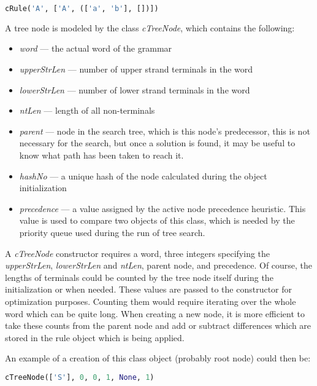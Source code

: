 \begin{lstlisting}[language=Python]
  cRule('A', ['A', (['a', 'b'], [])])
\end{lstlisting}

\bigskip

A tree node is modeled by the class \textit{cTreeNode}, which contains the following:
\begin{itemize}
  \item{\textit{word} --- the actual word of the grammar}
  \item{\textit{upperStrLen} --- number of upper strand terminals in the word}
  \item{\textit{lowerStrLen} --- number of lower strand terminals in the word}
  \item{\textit{ntLen} --- length of all non-terminals}
  \item{\textit{parent} --- node in the search tree, which is this node's  predecessor, this is not necessary for the search, but once a solution is found, it may be useful to know what path has been taken to reach it.}
  \item{\textit{hashNo} --- a unique hash of the node calculated during the object initialization}
  \item{\textit{precedence} --- a value assigned by the active node precedence heuristic. This value is used to compare two objects of this class, which is needed by the priority queue used during the run of tree search.}
\end{itemize}

A \textit{cTreeNode} constructor requires a word, three integers specifying the \textit{upperStrLen}, \textit{lowerStrLen} and \textit{ntLen}, parent node, and precedence. Of course, the lengths of terminals could be counted by the tree node itself during the initialization or when needed. These values are passed to the constructor for optimization purposes. Counting them would require iterating over the whole word which can be quite long. When creating a new node, it is more efficient to take these counts from the parent node and add or subtract differences which are stored in the rule object which is being applied.

An example of a creation of this class object (probably root node) could then be:

\begin{lstlisting}[language=Python]
  cTreeNode(['S'], 0, 0, 1, None, 1)
\end{lstlisting}

\bigskip


